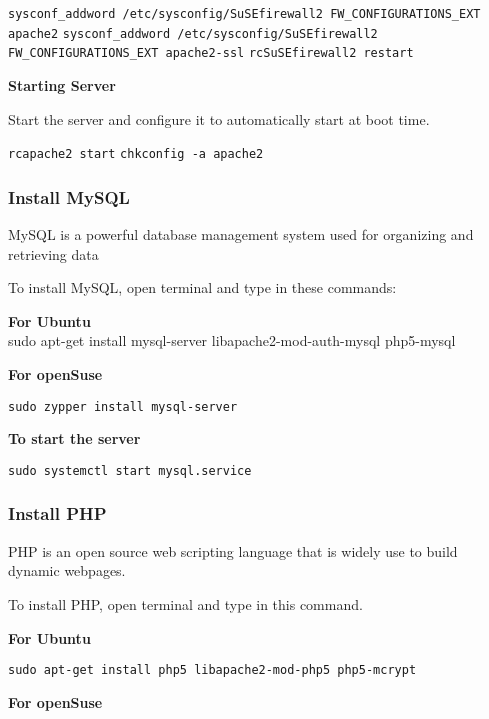 \documentclass[16pt]{article}
\begin{document}
  \texttt{sysconf\_addword /etc/sysconfig/SuSEfirewall2 FW\_CONFIGURATIONS\_EXT apache2}
  \texttt{sysconf\_addword /etc/sysconfig/SuSEfirewall2 FW\_CONFIGURATIONS\_EXT apache2-ssl}
  \texttt{rcSuSEfirewall2 restart}
  
   \vspace{0.5cm}

  \textbf{Starting Server}

  Start the server and configure it to automatically start at boot time.

  \texttt{rcapache2 start} \texttt{chkconfig -a apache2}
  
   \vspace{0.5cm}

  \subsubsection{Install MySQL}
  
   \vspace{0.5cm}

  MySQL is a powerful database management system used for organizing and
  retrieving data

  To install MySQL, open terminal and type in these commands:

  \textbf{For Ubuntu} \\ sudo apt-get install mysql-server
  libapache2-mod-auth-mysql php5-mysql

  \textbf{For openSuse}

  \texttt{sudo zypper install mysql-server}

  \textbf{To start the server}

  \texttt{sudo systemctl start mysql.service}
  
   \vspace{1cm}

  \subsubsection{Install PHP}
   \vspace{0.5cm}

  PHP is an open source web scripting language that is widely use to build
  dynamic webpages.

  To install PHP, open terminal and type in this command.

  \textbf{For Ubuntu}

  \texttt{sudo apt-get install php5 libapache2-mod-php5 php5-mcrypt}

  \textbf{For openSuse}
\end{document}
